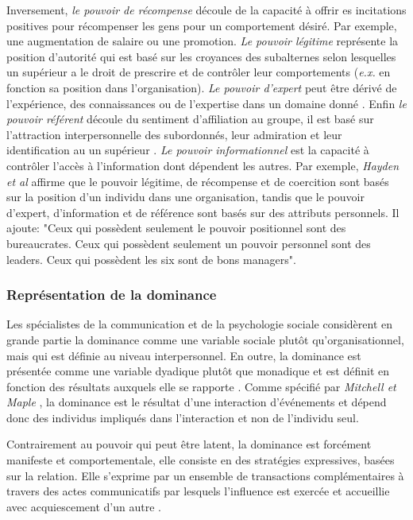 		Inversement, \textit{le pouvoir de récompense} découle de la capacité à offrir es incitations positives pour récompenser les gens pour un comportement désiré. Par exemple, une augmentation de salaire ou une promotion.
		\textit{Le pouvoir légitime} représente la position d'autorité qui est basé sur les croyances des subalternes selon lesquelles un supérieur a le droit de prescrire et de contrôler leur comportements (\emph{e.x.} en fonction sa position dans l'organisation). 
		\textit{Le pouvoir d'expert} peut être dérivé de l'expérience, des connaissances ou de l'expertise dans un domaine donné \cite{van2006power}. 
		Enfin \textit{le pouvoir référent} découle du sentiment d'affiliation au groupe, il est basé sur l'attraction interpersonnelle des subordonnés, leur admiration et leur identification au un supérieur \cite{van2006power}. 
		\textit{Le pouvoir informationnel} est la capacité à contrôler l'accès à l'information dont dépendent les autres. 
		Par exemple,  \emph{Hayden et al} \cite{dietler2010feasts} affirme que le pouvoir légitime, de récompense et de coercition sont basés sur la position d'un individu dans une organisation, tandis que le pouvoir d'expert, d'information et de référence sont basés sur des attributs personnels. Il ajoute: "Ceux qui possèdent seulement le pouvoir positionnel sont des bureaucrates. Ceux qui possèdent seulement un pouvoir personnel sont des leaders. Ceux qui possèdent les six sont de bons managers".
	
		\subsubsection{Représentation de la dominance}
		
		Les spécialistes de la communication et de la psychologie sociale considèrent en grande partie la dominance comme une variable sociale plutôt qu'organisationnel, mais qui est définie au niveau interpersonnel. En outre, la dominance est présentée comme une variable dyadique plutôt que monadique et est définit en fonction des résultats auxquels elle se rapporte  \cite{burgoon1998nature,burgoon2006nonverbal}.
		Comme spécifié par \emph{Mitchell et Maple} \cite{smither1993authoritarianism}, la dominance est le résultat d'une interaction d'événements et dépend donc des individus impliqués dans l'interaction et non de l'individu seul.
		
	 	Contrairement au pouvoir qui peut être latent, la dominance est forcément manifeste et comportementale, elle consiste en des stratégies expressives, basées sur la relation. Elle s'exprime par un ensemble de transactions complémentaires à travers des actes communicatifs par lesquels l'influence est exercée et accueillie avec acquiescement d'un autre \cite{burgoon2000interactionist,millar1987relational}. 
		
